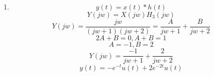 \documentclass[10pt,a4paper, margin=1in]{article}
\begin{document}
\begin{enumerate}
\begin{enumerate}
	\item %
    \begin{equation}
        y(t) = x(t)*h(t) 
    \end{equation}
    \begin{equation}
        Y(jw) = X(jw)H_3(jw)
    \end{equation}
    \begin{equation}
        Y(jw) = \frac{jw}{(jw+1)(jw+2)} = \frac{A}{jw+1} + \frac{B}{jw+2}
    \end{equation}
    \begin{equation}
        2A+B=0, A+B=1
    \end{equation}
    \begin{equation}
        A=-1, B=2
    \end{equation}
    \begin{equation}
        Y(jw) = \frac{-1}{jw+1} + \frac{2}{jw+2}
    \end{equation}
    \begin{equation}
        y(t) = -e^{-t}u(t) + 2e^{-2t}u(t)
    \end{equation}
    \end{enumerate}


\end{enumerate}
\end{document}
